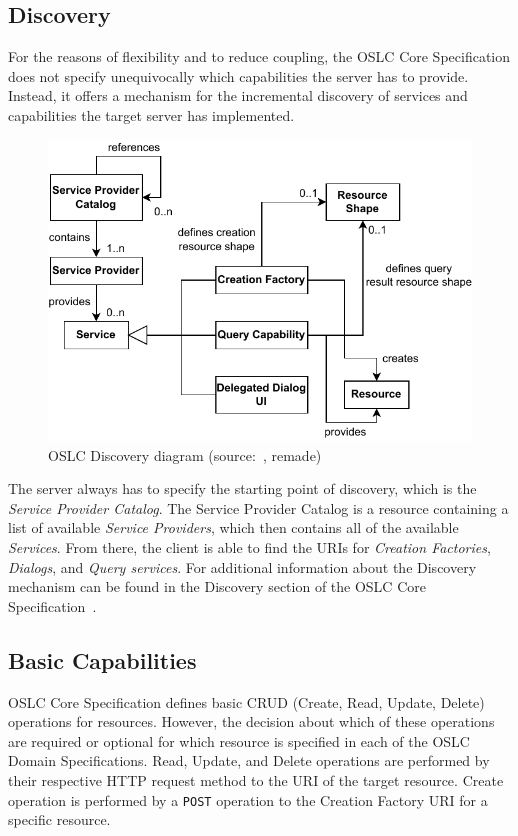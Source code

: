 \subsection*{Discovery}
\label{sec:oslc_discovery}
For the reasons of flexibility and to reduce coupling, the OSLC Core Specification does not specify unequivocally which capabilities the server has to provide. Instead, it offers a mechanism for the incremental discovery of services and capabilities the target server has implemented.

\begin{figure}[hbt]
  \centering
  \includegraphics[width=.8 \linewidth]{figures/oslc-discovery.pdf}
  \caption{OSLC Discovery diagram (source: \cite{oslc_core_discovery}, remade)}
  \label{fig:oslc_discovery}
\end{figure}

The server always has to specify the starting point of discovery, which is the \emph{Service Provider Catalog}. The Service Provider Catalog is a resource containing a list of available \emph{Service Providers}, which then contains all of the available \emph{Services}. From there, the client is able to find the URIs for \emph{Creation Factories}, \emph{Dialogs}, and \emph{Query services}. For additional information about the Discovery mechanism can be found in the Discovery section of the OSLC Core Specification \cite{oslc_core_discovery}.


\subsection*{Basic Capabilities}
\label{sec:oslc_basic_capabilities}
OSLC Core Specification defines basic CRUD (Create, Read, Update, Delete) operations for resources. However, the decision about which of these operations are required or optional for which resource is specified in each of the OSLC Domain Specifications. Read, Update, and Delete operations are performed by their respective HTTP request method to the URI of the target resource. Create operation is performed by a \texttt{POST} operation to the Creation Factory URI for a specific resource.

